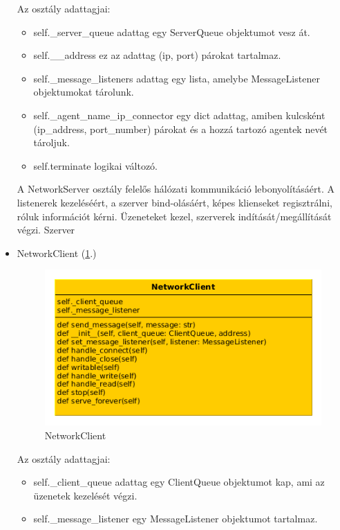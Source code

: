 \documentclass[a4paper,12pt,oneside]{report}
\begin{document}
\begin{itemize}
			Az osztály adattagjai:
			\begin{itemize}
				\itemsep0em
					\item self.\_server\_queue adattag egy ServerQueue objektumot vesz át.
					\item self.\_\_address ez az adattag (ip, port) párokat tartalmaz.
					\item self.\_message\_listeners adattag egy lista, amelybe MessageListener objektumokat tárolunk.
					\item self.\_agent\_name\_ip\_connector egy dict adattag, amiben kulcsként (ip\_address, port\_number) párokat és a hozzá tartozó agentek nevét tároljuk.
					\item self.terminate logikai változó.
			\end{itemize}
			
			A NetworkServer osztály felelős hálózati kommunikáció lebonyolításáért.
			A listenerek kezeléséért, a szerver bind-olásáért, képes klienseket regisztrálni, róluk információt kérni.
			Üzeneteket kezel, szerverek indítását/megállítását végzi.
			Szerver
\newpage
		\item NetworkClient (\ref{fig:networkclient}.)
			\begin{figure}[h]
			  \includegraphics[width=13cm,keepaspectratio]{networkclient.png}
			  \caption{NetworkClient}
			  \label{fig:networkclient}
			\end{figure}
			
			Az osztály adattagjai:
			\begin{itemize}
				\itemsep0em
					\item self.\_client\_queue adattag egy ClientQueue objektumot kap, ami az üzenetek kezelését végzi.
					\item self.\_message\_listener egy MessageListener objektumot tartalmaz.
			\end{itemize}
			

\end{itemize}
\end{document}
